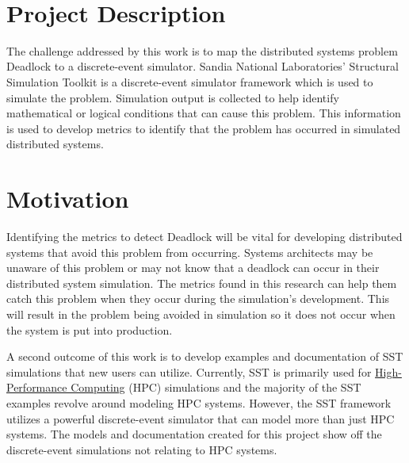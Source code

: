 \documentclass{article}
\begin{document}
\ \\


\section{Project Description} %

The challenge addressed by this work is to map the distributed systems problem Deadlock to a discrete-event simulator. Sandia National Laboratories' Structural Simulation Toolkit is a discrete-event simulator framework which is used to simulate the problem. Simulation output is collected to help identify mathematical or logical conditions that can cause this problem. This information is used to develop metrics to identify that the problem has occurred in simulated distributed systems.

\section{Motivation} %


Identifying the metrics to detect Deadlock will be vital for developing distributed systems that avoid this problem from occurring. Systems architects may be unaware of this problem or may not know that a deadlock can occur in their distributed system simulation. The metrics found in this research can help them catch this problem when they occur during the simulation's development. This will result in the problem being avoided in simulation so it does not occur when the system is put into production.

A second outcome of this work is to develop examples and documentation of SST simulations that new users can utilize. Currently, SST is primarily used for \href{https://en.wikipedia.org/wiki/High-performance_computing}{High-Performance Computing} (HPC) simulations and the majority of the SST examples revolve around modeling HPC systems. However, the SST framework utilizes a powerful discrete-event simulator that can model more than just HPC systems. The models and documentation created for this project show off the discrete-event simulations not relating to HPC systems.
\end{document}
